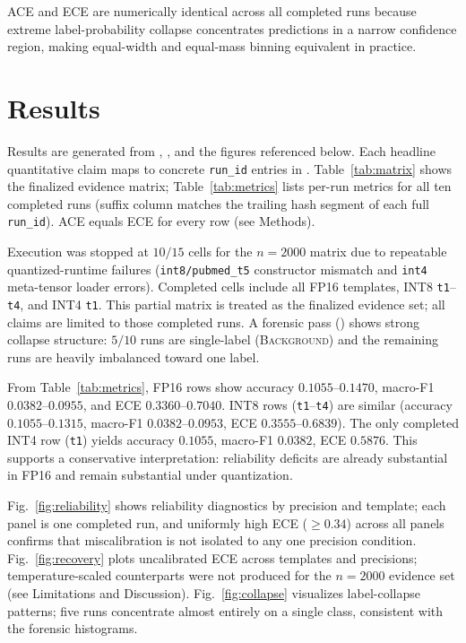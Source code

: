 \documentclass[conference]{IEEEtran}
\begin{document}
ACE and ECE are numerically identical across all completed runs because extreme label-probability collapse concentrates predictions in a narrow confidence region, making equal-width and equal-mass binning equivalent in practice.

\section{Results}

Results are generated from , , and the figures referenced below.
Each headline quantitative claim maps to concrete \texttt{run\_id} entries in .
Table~\ref{tab:matrix} shows the finalized evidence matrix; Table~\ref{tab:metrics} lists per-run metrics for all ten completed runs (suffix column matches the trailing hash segment of each full \texttt{run\_id}).
ACE equals ECE for every row (see Methods).

Execution was stopped at $10/15$ cells for the $n=2000$ matrix due to repeatable quantized-runtime failures (\texttt{int8/pubmed\_t5} constructor mismatch and \texttt{int4} meta-tensor loader errors).
Completed cells include all FP16 templates, INT8 \texttt{t1}--\texttt{t4}, and INT4 \texttt{t1}.
This partial matrix is treated as the finalized evidence set; all claims are limited to those completed runs.
A forensic pass () shows strong collapse structure: $5/10$ runs are single-label (\textsc{Background}) and the remaining runs are heavily imbalanced toward one label.

From Table~\ref{tab:metrics}, FP16 rows show accuracy $0.1055$--$0.1470$, macro-F1 $0.0382$--$0.0955$, and ECE $0.3360$--$0.7040$.
INT8 rows (\texttt{t1}--\texttt{t4}) are similar (accuracy $0.1055$--$0.1315$, macro-F1 $0.0382$--$0.0953$, ECE $0.3555$--$0.6839$).
The only completed INT4 row (\texttt{t1}) yields accuracy $0.1055$, macro-F1 $0.0382$, ECE $0.5876$.
This supports a conservative interpretation: reliability deficits are already substantial in FP16 and remain substantial under quantization.

Fig.~\ref{fig:reliability} shows reliability diagnostics by precision and template; each panel is one completed run, and uniformly high ECE ($\geq 0.34$) across all panels confirms that miscalibration is not isolated to any one precision condition.
Fig.~\ref{fig:recovery} plots uncalibrated ECE across templates and precisions; temperature-scaled counterparts were not produced for the $n=2000$ evidence set (see Limitations and Discussion).
Fig.~\ref{fig:collapse} visualizes label-collapse patterns; five runs concentrate almost entirely on a single class, consistent with the forensic histograms.
\end{document}
